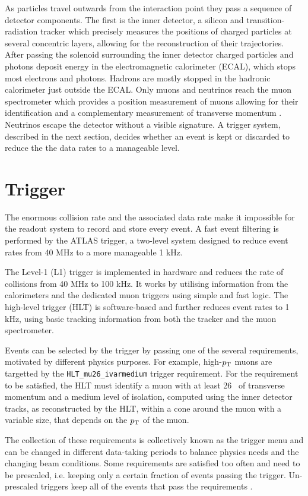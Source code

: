 As particles travel outwards from the interaction point they pass a
sequence of detector components. The first is the inner detector,
a silicon and transition-radiation tracker which precisely measures the
positions of charged particles at several concentric layers, allowing for
the reconstruction of their trajectories. After passing the solenoid
surrounding the inner detector charged particles and photons deposit
energy in the electromagnetic calorimeter (ECAL), which stops most electrons
and photons. Hadrons are mostly stopped in the hadronic calorimeter
just outside the ECAL. Only muons and neutrinos reach the muon spectrometer
which provides a position measurement of muons allowing for their
identification and a complementary measurement of transverse momentum
\cite{Aad:2008zzm}. Neutrinos escape the detector without a visible
signature. A trigger system, described in the next section,
decides whether an event is kept or discarded to reduce the the data
rates to a manageable level.

\section{Trigger}

The enormous collision rate and the associated data rate make it
impossible for the readout system to record and store every event. A fast
event filtering is performed by the ATLAS trigger, a two-level system
designed to reduce event rates from 40 MHz to a more manageable 1 kHz.

The Level-1 (L1) trigger is implemented in hardware and reduces the rate of
collisions from 40 MHz to 100 kHz. It works by utilising information
from the calorimeters and the dedicated muon triggers using simple
and fast logic. The high-level trigger (HLT) is software-based and further
reduces event rates to 1 kHz, using basic tracking information from both
the tracker and the muon spectrometer.

Events can be selected by the trigger by passing one of the several
requirements, motivated by different physics purposes. For example,
high-$p_{\text{T}}$ muons are targetted by the \texttt{HLT\_mu26\_ivarmedium} trigger
requirement. For the requirement to be satisfied, the HLT
must identify a muon with at least 26 \GeV~of transverse momentum and
a medium level of isolation, computed using the inner detector tracks,
as reconstructed by the HLT, within a cone around the muon with a variable
size, that depends on the $p_{\text{T}}$ of the muon.

The collection
of these requirements is collectively known as the trigger menu and can
be changed in different data-taking periods to balance physics needs
and the changing beam conditions. Some requirements are satisfied too
often and need to be prescaled, i.e. keeping only a certain fraction of events
passing the trigger. Un-prescaled triggers keep all of the events that
pass the requirements \cite{Aaboud:2016leb}.

